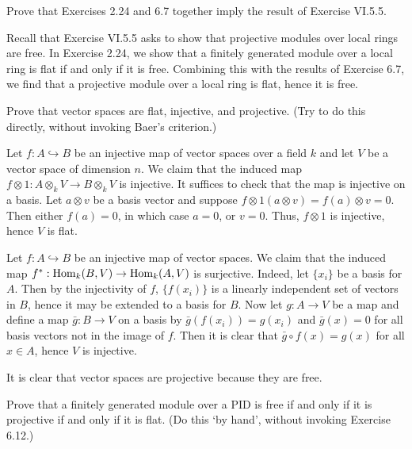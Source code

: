 \documentclass[../../master.tex]{subfiles}
\begin{document}
\begin{problem}
    Prove that Exercises 2.24 and 6.7 together imply the result of Exercise VI.5.5.
\end{problem}

\begin{solution}
    Recall that Exercise VI.5.5 asks to show that projective modules over local rings are free.
    In Exercise 2.24, we show that a finitely generated module over a local ring is flat if and only if it is free.
    Combining this with the results of Exercise 6.7, we find that a projective module over a local ring is flat, hence it is free.
\end{solution}

\begin{problem}
    Prove that vector spaces are flat, injective, and projective.
    (Try to do this directly, without invoking Baer's criterion.)
\end{problem}

\begin{solution}
    Let $f: A \hookrightarrow B$ be an injective map of vector spaces over a field $k$ and let $V$ be a vector space of dimension $n$.
    We claim that the induced map $f \otimes 1 : A \otimes_k V \to B \otimes_k V$ is injective.
    It suffices to check that the map is injective on a basis.
    Let $a \otimes v$ be a basis vector and suppose $f \otimes 1(a \otimes v) = f(a) \otimes v = 0$.
    Then either $f(a) = 0$, in which case $a = 0$, or $v = 0$.
    Thus, $f \otimes 1$ is injective, hence $V$ is flat.

    Let $f: A \hookrightarrow B$ be an injective map of vector spaces.
    We claim that the induced map $f^{*}: \operatorname{Hom}_k(B, V) \to \operatorname{Hom}_k(A, V)$ is surjective.
    Indeed, let $\{x_i\}$ be a basis for $A$.
    Then by the injectivity of $f$, $\{f(x_i)\}$ is a linearly independent set of vectors in $B$, hence it may be extended to a basis for $B$.
    Now let $g: A \to V$ be a map and define a map $\bar{g} : B \to V$ on a basis by $\bar{g}(f(x_i)) = g(x_i)$ and $\bar{g}(x) = 0$ for all basis vectors not in the image of $f$.
    Then it is clear that $\bar{g} \circ f(x) = g(x)$ for all $x \in A$, hence $V$ is injective.

    It is clear that vector spaces are projective because they are free.
\end{solution}

\begin{problem}
    Prove that a finitely generated module over a PID is free if and only if it is projective if and only if it is flat.
    (Do this `by hand', without invoking Exercise 6.12.)
\end{problem}
\end{document}
